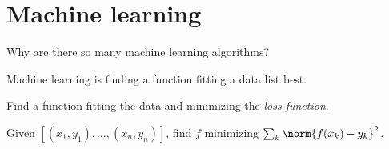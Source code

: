 \chapter{Machine learning}

Why are there so many machine learning algorithms?

Machine learning is finding a function
fitting a data list best.

Find a function fitting the data and minimizing the
%
\emph{loss function}.

Given \([(x_1,y_1),\ldots,(x_n,y_n)]\),
find \(f\) minimizing \(\sum_k \norm{f(x_k) - y_k}^2\).
